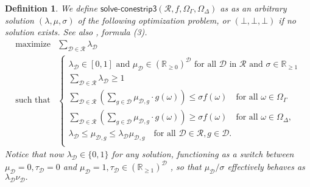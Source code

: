 \documentclass{article}
\theoremstyle{mytheorem}
\newtheorem{definition}[theorem]{Definition}
\newcommand{\func}[1]{\ensuremath{\textsf{#1}}} %
\newcommand{\set}[1]{\ensuremath{\{ #1 \} }} %
\begin{document}
\clearpage
\begin{definition}
We define $\func{solve-conestrip3}(\mathcal{R}, f, \Omega_\Gamma, \Omega_\Delta)$ 
as as an arbitrary solution $(\lambda, \mu, \sigma)$ of the following optimization problem, or $(\bot,\bot,\bot)$ if no solution exists.
See also \cite{Quaeghebeur2014}, formula (3).
\begin{equation} \label{eq:conestrip3}
\begin{array}{ll}
    \text{maximize} & \sum\limits_{\mathcal{D} \in \mathcal{R}} \lambda_\mathcal{D}
    \\ [0.5cm]
    \text{such that} & 

    \left\{
    \begin{array}{ll}
         \lambda_\mathcal{D} \in [0,1] \text{ and } \mu_\mathcal{D} \in (\mathbb{R}_{\geq 0})^\mathcal{D} \text{ for all } \mathcal{D} \text{ in } \mathcal{R} \text{ and } \sigma \in \mathbb{R}_{\geq 1} \\ [0.2cm]

         \sum\limits_{\mathcal{D} \in \mathcal{R}} \lambda_\mathcal{D} \geq 1 \\ [0.5cm]
         
         \sum\limits_{\mathcal{D} \in \mathcal{R}}
         (
         \sum\limits_{g \in \mathcal{D}} \mu_{\mathcal{D},g} \cdot g(\omega)
         )
          \leq \sigma f(\omega)
         \quad \text{for all } \omega \in \Omega_\Gamma \\ [0.5cm] 
         
         \sum\limits_{\mathcal{D} \in \mathcal{R}}
         (
         \sum\limits_{g \in \mathcal{D}} \mu_{\mathcal{D},g} \cdot g(\omega)
         )
          \geq \sigma f(\omega)
         \quad \text{for all } \omega \in \Omega_\Delta, \\
         
         \lambda_\mathcal{D} \leq \mu_{\mathcal{D},g} \leq \lambda_\mathcal{D} \mu_{\mathcal{D},g}
         \quad \text{for all } \mathcal{D} \in \mathcal{R}, g \in \mathcal{D}. \\
    \end{array}
    \right.
\end{array}
\end{equation}
Notice that now $\lambda_\mathcal{D} \in \set{0, 1}$ for any solution, functioning as a switch between $\mu_\mathcal{D} = 0, \tau_\mathcal{D} = 0$ and $\mu_\mathcal{D} = 1, \tau_\mathcal{D} \in (\mathbb{R}_{\geq 1} )^\mathcal{D}$ , so that $\mu_\mathcal{D} / \sigma$ effectively behaves as $\lambda_\mathcal{D} \nu_\mathcal{D}.$
\end{definition}
\end{document}
